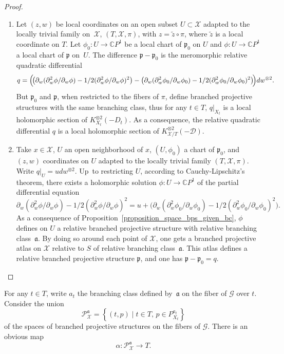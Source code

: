 \documentclass[JEP,XML,SOM,Unicode,NoEqCountersInSection,published]{cedram}
\newcommand{\CP}{\mathbb CP}
\theoremstyle{definition}
\theoremstyle{plain}
\begin{document}
\skpt
\begin{proof}
\begin{enumerate}
\item
Let $(z, w)$ be local coordinates on an open subset $U \!\subset\! \mathcal X$ adapted to the locally trivial family on~$\mathcal X$, $(T, \mathcal X, \pi)$, \ie with $z = \widetilde z \circ \pi$, where $\widetilde z$ is a local coordinate on $T$. Let \hbox{$\phi_0: U \!\to\! \CP^1$} be a local chart of $\mathfrak p_0$ on $U$ and $\phi: U \to \CP^1$ a local chart of $\mathfrak p$ on~$U$.
The difference $\mathfrak p - \mathfrak p_0$ is the meromorphic relative quadratic differential
\[
q =\Bigl(\!\bigl(\partial_w(\partial^2_w \phi / \partial_w \phi) - 1/2 (\partial^2_w \phi / \partial_w \phi)^2\bigr)
- \bigl(\partial_w(\partial^2_w \phi_0 / \partial_w \phi_0) - 1/2 (\partial^2_w \phi_0 / \partial_w \phi_0)^2\bigr)\!\Bigr)dw^{\otimes 2}.
\]
But $\mathfrak p_0$ and $\mathfrak p$, when restricted to the fibers of $\pi$, define branched projective structures with the same branching class, thus for any $t \in T$, $q|_{X_t}$ is a local holomorphic section of $K_{X_t}^{\otimes 2}(-D_t)$. As a consequence, the relative quadratic differential $q$ is a local holomorphic section of $K_{\mathcal X / T}^{\otimes 2}(-\mathcal D)$.
\item
Take $x \in \mathcal X$, $U$ an open neighborhood of $x$, $(U, \phi_0)$ a chart of $\mathfrak p_0$, and $(z, w)$ coordinates on $U$ adapted to the locally trivial family $(T, \mathcal X, \pi)$.
Write $q|_U = udw^{\otimes 2}$. Up~to restricting $U$, according to Cauchy-Lipschitz's theorem, there exists a holomorphic solution $\phi: U\to \CP^1$ of the partial differential equation
\[
\partial_w(\partial^2_w \phi / \partial_w \phi) - 1/2 (\partial^2_w \phi / \partial_w \phi)^2 = u + \bigl(\partial_w(\partial^2_w \phi_0 / \partial_w \phi_0) - 1/2 (\partial^2_w \phi_0 / \partial_w \phi_0)^2\bigr).
\]
As a consequence of Proposition~\ref{proposition_space_bps_given_bc}, $\phi$ defines on $U$ a relative branched projective structure with relative branching class~$\mathfrak a$.
By doing so around each point of $\mathcal X$, one gets a branched projective atlas on $\mathcal X$ relative to $S$ of relative branching class~$\mathfrak a$.
This atlas defines a relative branched projective structure $\mathfrak p$, and one has $\mathfrak p-\mathfrak p_0 = q$.\qedhere
\end{enumerate}
\end{proof}

For any $t \in T$, write $a_t$ the branching class defined by~$\mathfrak a$ on the fiber of $\mathcal G$ over $t$.
Consider the union\vspace*{-3pt}
\begin{equation}\label{eq_base_univ_family_bps_over_bc}
\mathcal P_{\mathcal X}^{\mathfrak a} = \left \{(t, p)\mid t \in T,\, p \in P_{X_t}^{a_t}\right \}
\end{equation}
of the spaces of branched projective structures on the fibers of $\mathcal G$.
There is an obvious map\vspace*{-3pt}
\begin{equation}\label{eq_proj_bps_bc}
\alpha: \mathcal P_{\mathcal X}^{\mathfrak a} \to T.
\end{equation}
\end{document}
